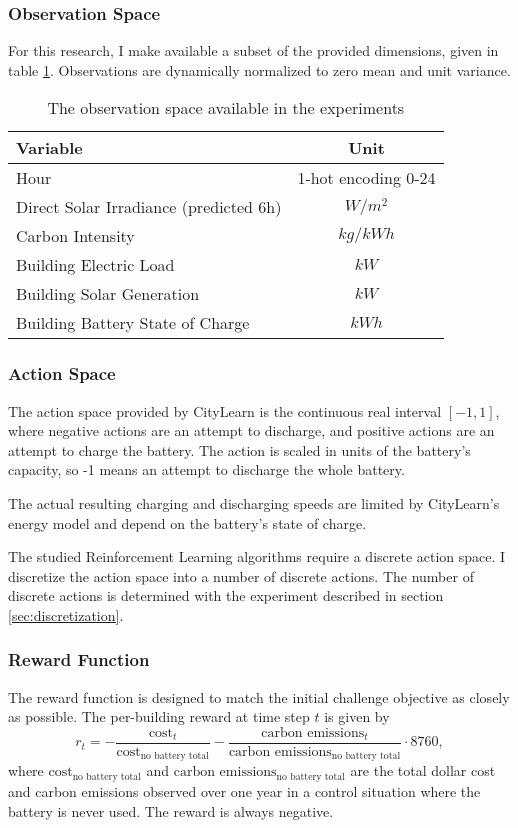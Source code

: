 \subsubsection{Observation Space}
For this research, I make available a subset of the provided dimensions, given in table \ref{tab:observations}. Observations are dynamically normalized to zero mean and unit variance.

\begin{table}[h]
    \caption{The observation space available in the experiments} \label{tab:observations}
    \centering
    \begin{tabular}{l|c}
        Variable & Unit \\ \hline
        Hour & 1-hot encoding 0-24 \\
        Direct Solar Irradiance (predicted 6h) & $W/m^2$ \\
        Carbon Intensity & $kg/kWh$ \\
        Building Electric Load & $kW$\\
        Building Solar Generation & $kW$\\
        Building Battery State of Charge & $kWh$\\
    \end{tabular}
\end{table}

\subsubsection{Action Space}
The action space provided by CityLearn is the continuous real interval $[-1,1]$, where negative actions are an attempt to discharge, and positive actions are an attempt to charge the battery.
The action is scaled in units of the battery's capacity, so -1 means an attempt to discharge the whole battery.

The actual resulting charging and discharging speeds are limited by CityLearn's energy model and depend on the battery's state of charge.

The studied Reinforcement Learning algorithms require a discrete action space.
I discretize the action space into a number of discrete actions. The number of discrete actions is determined with the experiment described in section \ref{sec:discretization}.

\subsubsection{Reward Function}
The reward function is designed to match the initial challenge objective as closely as possible.
The per-building reward at time step $t$ is given by
$$r_t = - \frac{\text{cost}_t}{\text{cost}_\text{no battery total}}
    - \frac{\text{carbon emissions}_t}{\text{carbon emissions}_\text{no battery total}} \cdot 8760,$$
where $\text{cost}_\text{no battery total}$ and $\text{carbon emissions}_\text{no battery total}$ are the total dollar cost and carbon emissions observed over one year in a control situation where the battery is never used.
The reward is always negative.

